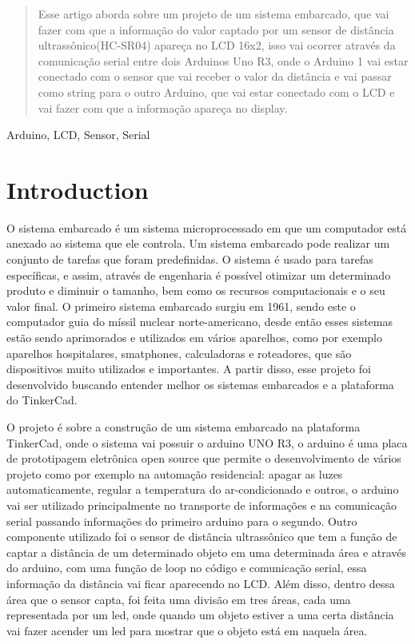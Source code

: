 \documentclass[conference]{IEEEtran}
\begin{document}
\begin{abstract}
Esse artigo aborda sobre um projeto de um sistema embarcado, que vai fazer com que a informação do valor captado por um sensor de distância ultrassônico(HC-SR04) apareça no LCD 16x2, 
isso vai ocorrer através da comunicação serial entre dois Arduinos Uno R3, onde o Arduino 1 vai estar conectado com o sensor que vai receber o valor da distância e vai passar como 
string para o outro Arduino, que vai estar conectado com o LCD e vai fazer com que a informação apareça no display.
\end{abstract}

\begin{IEEEkeywords}
Arduino, LCD, Sensor, Serial 
\end{IEEEkeywords}

\section{Introduction}
O sistema embarcado é um sistema microprocessado em que um computador está anexado ao sistema que ele controla. 
Um sistema embarcado pode realizar um conjunto de tarefas que foram predefinidas. O sistema é usado para tarefas específicas, e assim, através de engenharia 
é possível otimizar um determinado produto e diminuir o tamanho, bem como os recursos computacionais e o seu valor final.
O primeiro sistema embarcado surgiu em 1961, sendo este o computador guia do míssil nuclear norte-americano, desde então esses sistemas estão sendo aprimorados e 
utilizados em vários aparelhos, como por exemplo aparelhos hospitalares, smatphones, calculadoras e roteadores, que são dispositivos muito utilizados e importantes.
A partir disso, esse projeto foi desenvolvido buscando entender melhor os sistemas embarcados e a plataforma do TinkerCad.

O projeto é sobre a construção de um sistema embarcado na plataforma TinkerCad, onde o sistema vai possuir o arduino UNO R3, o arduino é uma placa de prototipagem eletrônica 
open source que permite o desenvolvimento de vários projeto como por exemplo na automação residencial: apagar as luzes automaticamente, regular a temperatura do ar-condicionado 
e outros, o arduino vai ser utilizado principalmente no transporte de informações e na comunicação serial passando informações do primeiro arduino para o segundo. 
Outro componente utilizado foi o sensor de distância ultrassônico que tem a função de captar a distância de um determinado objeto em uma determinada área e através 
do arduino, com uma função de loop no código e comunicação serial, essa informação da distância vai ficar aparecendo no LCD. Além disso, dentro dessa área que o sensor capta, foi feita
uma divisão em tres áreas, cada uma representada por um led, onde quando um objeto estiver a uma certa distância vai fazer acender um led para mostrar que o objeto está em naquela área.       
\end{document}
